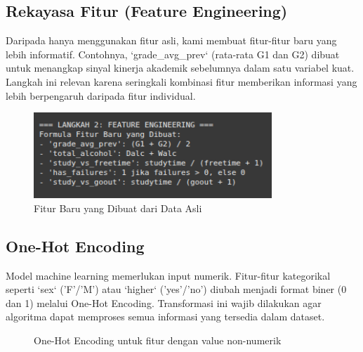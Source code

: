 \subsection{Rekayasa Fitur (Feature Engineering)}
Daripada hanya menggunakan fitur asli, kami membuat fitur-fitur baru yang lebih informatif. Contohnya, `grade_avg_prev` (rata-rata G1 dan G2) dibuat untuk menangkap sinyal kinerja akademik sebelumnya dalam satu variabel kuat. Langkah ini relevan karena seringkali kombinasi fitur memberikan informasi yang lebih berpengaruh daripada fitur individual.
\begin{figure}[h!]
    \centering
    \includegraphics[width=0.8\textwidth]{images/FeatureEng.png}
    \caption{Fitur Baru yang Dibuat dari Data Asli}
\end{figure}

\subsection{One-Hot Encoding}
Model machine learning memerlukan input numerik. Fitur-fitur kategorikal seperti `sex` ('F'/'M') atau `higher` ('yes'/'no') diubah menjadi format biner (0 dan 1) melalui One-Hot Encoding. Transformasi ini wajib dilakukan agar algoritma dapat memproses semua informasi yang tersedia dalam dataset.
\begin{figure}[h!]
    \centering
    \caption{One-Hot Encoding untuk fitur dengan value non-numerik}
\end{figure}
